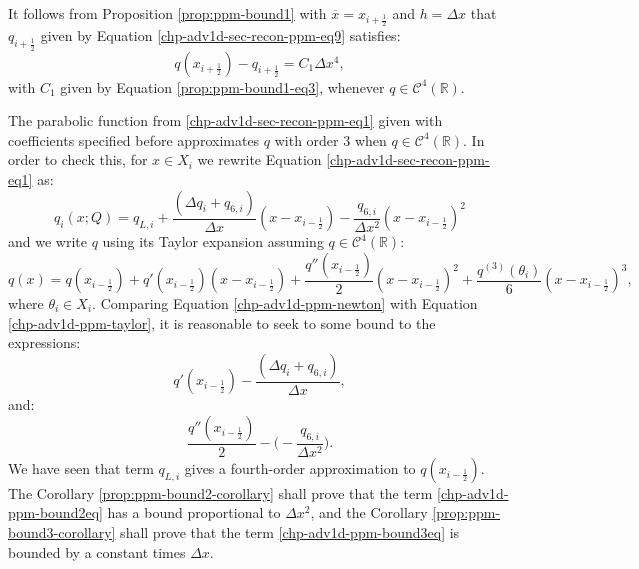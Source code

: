 \begin{corollary}
	\label{prop:ppm-bound1-corollary}
	It follows from Proposition \ref{prop:ppm-bound1} with
	$\overline{x} = x_{i+\frac{1}{2}}$ and $h = \Delta x$
	that $q_{i+\frac{1}{2}}$ given by Equation \eqref{chp-adv1d-sec-recon-ppm-eq9} satisfies:
	\begin{equation}
		\label{ppm-edges-bound1}
		q{(x_{i+\frac{1}{2}})} - q_{i+\frac{1}{2}} = C_1\Delta x^4,
	\end{equation}
	with $C_1$ given by Equation \eqref{prop:ppm-bound1-eq3}, whenever $q \in \mathcal{C}^4(\mathbb{R}).$
\end{corollary}

The parabolic function from \eqref{chp-adv1d-sec-recon-ppm-eq1}  given with 
coefficients specified before approximates $q$ with order 3 when 
$q \in \mathcal{C}^4(\mathbb{R})$.
In order to check this, for $x \in X_i$ we rewrite Equation 
\eqref{chp-adv1d-sec-recon-ppm-eq1} as: 
\begin{equation}
	\label{chp-adv1d-ppm-newton}
	q_i(x;Q) = q_{L,i} + \frac{(\Delta q_i + q_{6, i})}{\Delta x}(x-x_{i-\frac{1}{2}})
	-\frac{q_{6, i}}{\Delta x^2}(x-x_{i-\frac{1}{2}})^2
\end{equation}
and we write $q$ using its Taylor expansion assuming $q \in \mathcal{C}^4(\mathbb{R})$:
\begin{equation}
	\label{chp-adv1d-ppm-taylor}
	q(x) = q(x_{i-\frac{1}{2}}) + q'(x_{i-\frac{1}{2}})(x-x_{i-\frac{1}{2}})
	+ \frac{q''(x_{i-\frac{1}{2}})}{2}(x-x_{i-\frac{1}{2}})^2
	+ \frac{q^{(3)}(\theta_i)}{6}(x-x_{i-\frac{1}{2}})^3,
\end{equation}
where $\theta_i \in X_i$.
Comparing Equation \eqref{chp-adv1d-ppm-newton} with Equation \eqref{chp-adv1d-ppm-taylor},
it is reasonable to seek to some bound to the expressions:
\begin{equation}
	\label{chp-adv1d-ppm-bound2eq}
	q'(x_{i-\frac{1}{2}})-\frac{(\Delta q_i + q_{6, i})}{\Delta x},
\end{equation}
and:
\begin{equation} 
	\label{chp-adv1d-ppm-bound3eq}
	\frac{q''(x_{i-\frac{1}{2}})}{2} -\bigg(-\frac{q_{6, i}}{\Delta x^2}\bigg).
\end{equation}
We have seen that term $q_{L,i}$ gives a fourth-order approximation to $q(x_{i-\frac{1}{2}})$.
The Corollary \ref{prop:ppm-bound2-corollary} shall prove that 
the term \eqref{chp-adv1d-ppm-bound2eq} has a bound proportional to $\Delta x^2$, and
the Corollary \ref{prop:ppm-bound3-corollary} shall prove that the
term \eqref{chp-adv1d-ppm-bound3eq} is bounded by a constant times $\Delta x$.

